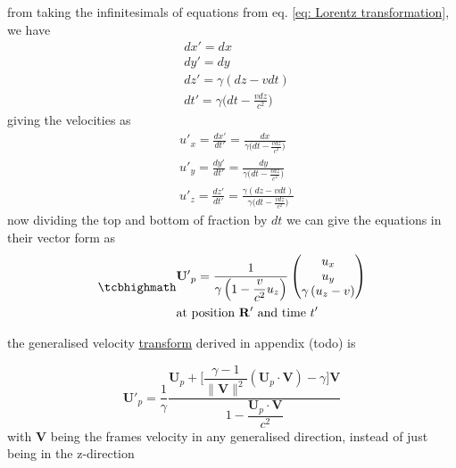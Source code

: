 from taking the infinitesimals of equations from eq. \eqref{eq: Lorentz transformation}, we have
\begin{equation}%
	\begin{aligned}
		 & dx'=dx                                    \\ & dy'=dy \\ &dz' = \gamma (dz-vdt)  \\
		 & dt'=\gamma \bigg(dt-\frac{vdz}{c^2}\bigg)
	\end{aligned}
\end{equation}%
giving the velocities as
\begin{equation}%
	\begin{aligned}
		 & u'_x = \frac{dx'}{dt'}=\frac{dx}{\gamma \bigg(dt-\frac{vdz}{c^2}\bigg) } \\ & u'_y = \frac{dy'}{dt'}=\frac{dy}{\gamma \bigg(dt-\frac{vdz}{c^2}\bigg) }\\ & u'_z = \frac{dz'}{dt'} = \frac{\gamma (dz-vdt)}{\gamma \bigg(dt-\frac{vdz}{c^2}\bigg) }
	\end{aligned}
\end{equation}%
now dividing the top and bottom of fraction by $dt$ we can give the equations in their vector form as
\begin{equation}%
	\label{vector velocity transform}
	\mhl{
		\begin{aligned}
			 & \mathbf{U'}_p = \dfrac{1}{\gamma\left(1- \dfrac{v}{c^2} u_z\right) }
			\begin{pmatrix}
				u_x \\ u_y  \\ \gamma \left( u_z  - v  \right) \\
			\end{pmatrix}                          \\
			 & \text{at position $\mathbf{R'}$ and time $t'$ }
		\end{aligned}
	}
\end{equation}%

the generalised velocity \hyperlink{def-transform}{transform} derived in appendix (todo) is

\begin{equation}
	\mathbf{U'}_p  = \dfrac{1}{\gamma} \dfrac{\mathbf{U}_p + \Big[\dfrac{\gamma-1}{\|\mathbf{V}\|^2}(\mathbf{U}_p\cdot \mathbf{V})- \gamma \Big] \mathbf{V}}{1 - \dfrac{\mathbf{U}_p\cdot\mathbf{V}}{c^2}}
\end{equation}
with $\mathbf{V}$ being the frames velocity in any generalised direction, instead of just being in the z-direction


